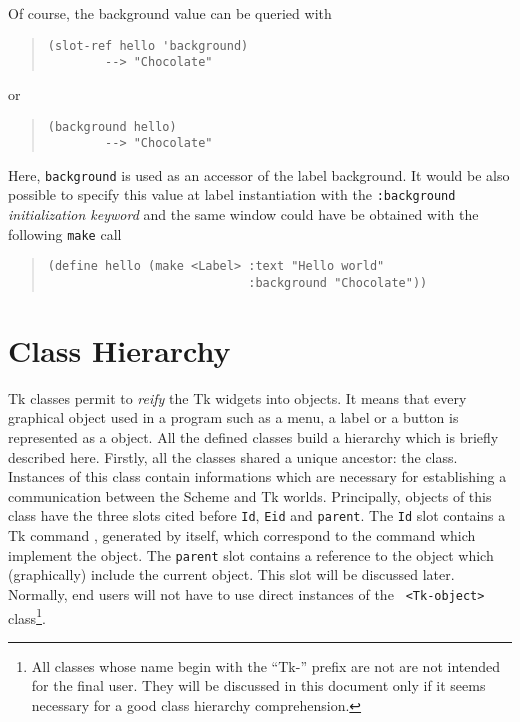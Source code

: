 Of course, the background value can be queried with
\begin{quote}
\begin{verbatim}
(slot-ref hello 'background)
        --> "Chocolate"
\end{verbatim}
\end{quote}
\noindent
or
\begin{quote}
\begin{verbatim}
(background hello)
        --> "Chocolate"
\end{verbatim}
\end{quote}

Here, {\tt background} is used as an accessor of the label
background. It would be also possible to specify this value at label
instantiation with the {\tt :background} {\em initialization keyword
} and the same window could have be obtained
with the following {\tt make} call 
\begin{quote}
\begin{verbatim}
(define hello (make <Label> :text "Hello world" 
                            :background "Chocolate"))
\end{verbatim}
\end{quote}

\section{Class Hierarchy}

{\stklos} Tk classes permit to {\em reify} the Tk widgets into {\stklos
objects}. It means that every graphical object used in a program such as a
menu, a label or a button is represented as a {\stklos} object. All the
defined {\stklos} classes build a hierarchy which is briefly described
here. Firstly, all the classes shared a unique ancestor: the {\tt <Tk-object>}
class. Instances of this class contain informations which are necessary for
establishing a communication between the Scheme and Tk worlds. Principally,
objects of this class have the three slots cited before {\tt Id}, {\tt Eid} and {\tt parent}. The
{\tt Id} slot contains a Tk command \cite{STk-ref-man}, generated by
{\stklos} itself, which correspond to the {\stk} command which implement the
object.  The {\tt parent} slot contains a reference to the object which
(graphically) include the current object. This slot will be discussed later.
Normally, end users will not have to use direct instances of the {\tt
<Tk-object>} class\footnote{All classes whose name begin with the ``Tk-''
prefix are not are not intended for the final user. They will be discussed in
this document only if it seems necessary for a good class hierarchy
comprehension.}.

